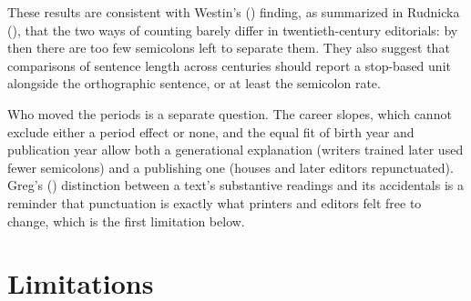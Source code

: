 \documentclass[
  11pt,
]{article}
\newcounter{none} %
\begin{document}
These results are consistent with Westin's () finding, as summarized in Rudnicka (), that the two ways of counting barely differ in
twentieth-century editorials: by then there are too few semicolons left to separate them. They also suggest that comparisons of sentence length across centuries should report a stop-based unit
alongside the orthographic sentence, or at least the semicolon rate.

Who moved the periods is a separate question. The career slopes, which cannot exclude either a period effect or none, and the equal fit of birth year and publication year allow both a generational
explanation (writers trained later used fewer semicolons) and a publishing one (houses and later editors repunctuated). Greg's () distinction between a text's substantive
readings and its accidentals is a reminder that punctuation is exactly what printers and editors felt free to change, which is the first limitation below.

\section{Limitations}\label{limitations}
\end{document}
